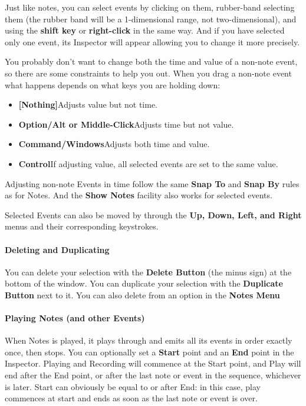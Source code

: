 \documentclass[twoside,10pt]{article}
\begin{document}
Just like notes, you can select events by clicking on them, rubber-band selecting them (the rubber band will be a 1-dimensional range, not two-dimensional), and using the {\bf shift key} or {\bf right-click} in the same way.  And if you have selected only one event, its Inspector will appear allowing you to change it more precisely.

You probably don't want to change both the time and value of a non-note event, so there are some constraints to help you out.  When you drag a non-note event what happens depends on what keys you are holding down:

\begin{itemize}
\item {\bf [Nothing]}\qquad Adjusts value but not time.
\item {\bf Option/Alt or Middle-Click}\qquad Adjusts time but not value.
\item {\bf Command/Windows}\qquad Adjusts both time and value.
\item {\bf Control}\qquad If adjusting value, all selected events are set to the same value.
\end{itemize}        

Adjusting non-note Events in time follow the same {\bf Snap To} and {\bf Snap By} rules as for Notes.  And the {\bf Show Notes} facility also works for selected events.

Selected Events can also be moved by through the {\bf Up, Down, Left, and Right} menus and their corresponding keystrokes. 

\paragraph{Deleting and Duplicating}

You can delete your selection with the {\bf Delete Button} (the minus sign) at the bottom of the window.  You can duplicate your selection with the {\bf Duplicate Button} next to it.  You can also delete from an option in the {\bf Notes Menu}  

\paragraph{Playing Notes (and other Events)}

When Notes is played, it plays through and emits all its events in order exactly once, then stops.  You can optionally set a {\bf Start} point and an {\bf End} point in the Inspector.  Playing and Recording will commence at the Start point, and Play will end after the End point, or after the last note or event in the sequence, whichever is later.  Start can obviously be equal to or after End: in this case, play commences at start and ends as soon as the last note or event is over.
\end{document}
